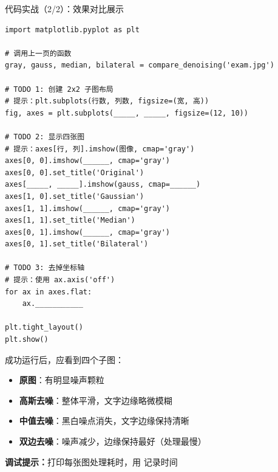 \begin{frame}[fragile]{代码实战（2/2）：效果对比展示}
	\begin{lstlisting}[basicstyle=\ttfamily\tiny]
import matplotlib.pyplot as plt

# 调用上一页的函数
gray, gauss, median, bilateral = compare_denoising('exam.jpg')

# TODO 1: 创建 2x2 子图布局
# 提示：plt.subplots(行数, 列数, figsize=(宽, 高))
fig, axes = plt.subplots(_____, _____, figsize=(12, 10))

# TODO 2: 显示四张图
# 提示：axes[行, 列].imshow(图像, cmap='gray')
axes[0, 0].imshow(______, cmap='gray')
axes[0, 0].set_title('Original')
axes[_____, _____].imshow(gauss, cmap=______)
axes[1, 0].set_title('Gaussian')
axes[1, 1].imshow(______, cmap='gray')
axes[1, 1].set_title('Median')
axes[0, 1].imshow(______, cmap='gray')
axes[0, 1].set_title('Bilateral')

# TODO 3: 去掉坐标轴
# 提示：使用 ax.axis('off')
for ax in axes.flat:
    ax.___________

plt.tight_layout()
plt.show()
	\end{lstlisting}

	\vspace{0.2cm}
	\begin{tcolorbox}[colback=green!5!white,colframe=green!50!black,title=\textbf{预期结果}]
		\small
		成功运行后，应看到四个子图：
		\begin{itemize}
			\item \textbf{原图}：有明显噪声颗粒
			\item \textbf{高斯去噪}：整体平滑，文字边缘略微模糊
			\item \textbf{中值去噪}：黑白噪点消失，文字边缘保持清晰
			\item \textbf{双边去噪}：噪声减少，边缘保持最好（处理最慢）
		\end{itemize}
		\textbf{调试提示：}打印每张图处理耗时，用  记录时间
	\end{tcolorbox}
\end{frame}

